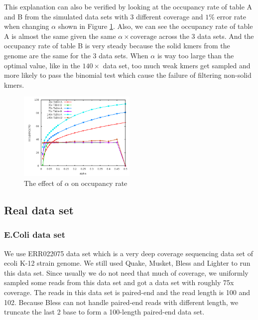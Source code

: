 \documentclass[10pt]{article}
\begin{document}
This explanation can also be verified by looking at the occupancy rate of table A and B from the simulated data sets with 3 different coverage and $1\%$ error rate when changing $\alpha$ shown in Figure \ref{fig:bloom_occupancy_alpha_all}. Also, we can see the occupancy rate of table A is almost the same given the same $\alpha\times\mbox{coverage}$ across the 3 data sets. And the occupancy rate of table B is very steady because the solid kmers from the genome are the same for the 3 data sets. When $\alpha$ is way too large than the optimal value, like in the $140\times$ data set, too much weak kmers get sampled and more likely to pass the binomial test which cause the failure of filtering non-solid kmers.

\begin{figure}[h!]
\begin{center}
\includegraphics[width=0.5\textwidth]{bloom_occupancy_alpha_all.png}
\caption{The effect of $\alpha$ on occupancy rate\label{fig:bloom_occupancy_alpha_all}}
\end{center}
\end{figure}

\subsection*{Real data set}
\subsubsection*{E.Coli data set}
We use ERR022075 data set which is a very deep coverage sequencing data set of ecoli K-12 strain genome. We still used Quake, Musket, Bless and Lighter to run this data set. Since usually we do not need that much of coverage, we uniformly sampled some reads from this data set and got a data set with roughly 75x coverage. The reads in this data set is paired-end and the read length is 100 and 102. Because Bless can not handle paired-end reads with different length, we truncate the last 2 base to form a 100-length paired-end data set.
\end{document}
